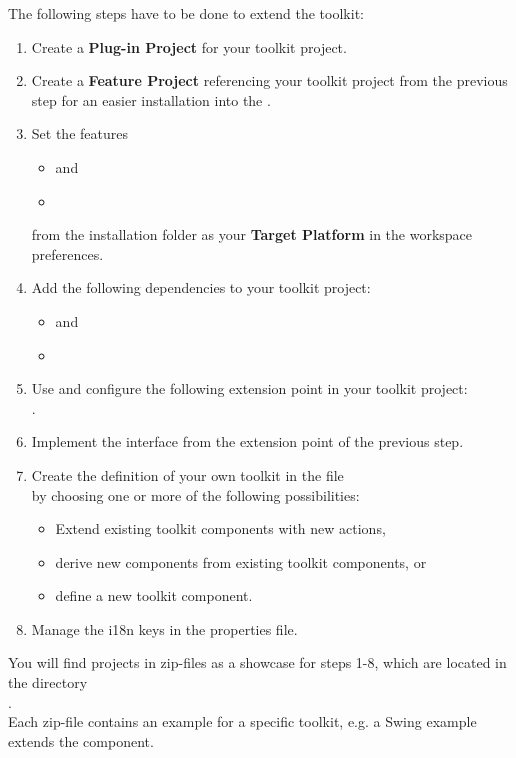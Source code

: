 The following steps have to be done to extend the \ite{} toolkit:
\begin{enumerate}
 \item Create a \textbf{Plug-in Project} for your toolkit project.
 \item Create a \textbf{Feature Project} referencing your toolkit project from
 the previous step for an easier installation into the \ite{}.
 \item Set the features
       \begin{itemize}
        \item {} and
        \item {}
       \end{itemize}
       from the \app{} installation folder \bxshell{\MakeLowercase{\app{}}/} as
       your \textbf{Target Platform} in the workspace preferences.
 \item Add the following dependencies to your toolkit project:
       \begin{itemize}
        \item {} and
        \item {}
       \end{itemize}
 \item Use and configure the following extension point in your toolkit
       project:\\
       .
 \item Implement the interface  from the extension
 point of the previous step.
 \item Create the definition of your own toolkit in the file\\
        by choosing one or more of the following
       possibilities:
       \begin{itemize}
        \item Extend existing toolkit components with new actions,
        \item derive new components from existing toolkit components, or
        \item define a new toolkit component.
       \end{itemize}
 \item Manage the i18n keys in the properties file.
\end{enumerate}

You will find projects in zip-files as a showcase for steps 1-8, which are
located in the directory\\
.\\
Each zip-file contains an example for a specific toolkit, e.g. a Swing example
extends the  component.

